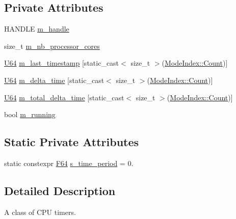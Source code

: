 \subsection*{Private Attributes}
\begin{DoxyCompactItemize}
\item 
H\+A\+N\+D\+LE \hyperlink{classmage_1_1_c_p_u_timer_a95b8ac18c050ed25293c8a923087369a}{m\+\_\+handle}
\item 
size\+\_\+t \hyperlink{classmage_1_1_c_p_u_timer_ac5fdb38a70c74815231b5efd8d746be1}{m\+\_\+nb\+\_\+processor\+\_\+cores}
\item 
\hyperlink{namespacemage_a6672cf3c861707ce4a3235a3eb43941d}{U64} \hyperlink{classmage_1_1_c_p_u_timer_a14b5ef7beba6c33769ac66ef171d0f0b}{m\+\_\+last\+\_\+timestamp} \mbox{[}static\+\_\+cast$<$ size\+\_\+t $>$(\hyperlink{classmage_1_1_c_p_u_timer_a98d59db3c396b14269c937e016c7625eae93f994f01c537c4e2f7d8528c3eb5e9}{Mode\+Index\+::\+Count})\mbox{]}
\item 
\hyperlink{namespacemage_a6672cf3c861707ce4a3235a3eb43941d}{U64} \hyperlink{classmage_1_1_c_p_u_timer_a2ce9eda81a57934b172b426238d4587d}{m\+\_\+delta\+\_\+time} \mbox{[}static\+\_\+cast$<$ size\+\_\+t $>$(\hyperlink{classmage_1_1_c_p_u_timer_a98d59db3c396b14269c937e016c7625eae93f994f01c537c4e2f7d8528c3eb5e9}{Mode\+Index\+::\+Count})\mbox{]}
\item 
\hyperlink{namespacemage_a6672cf3c861707ce4a3235a3eb43941d}{U64} \hyperlink{classmage_1_1_c_p_u_timer_a1c6d043eb08b1689d0f52dbd886fa9d4}{m\+\_\+total\+\_\+delta\+\_\+time} \mbox{[}static\+\_\+cast$<$ size\+\_\+t $>$(\hyperlink{classmage_1_1_c_p_u_timer_a98d59db3c396b14269c937e016c7625eae93f994f01c537c4e2f7d8528c3eb5e9}{Mode\+Index\+::\+Count})\mbox{]}
\item 
bool \hyperlink{classmage_1_1_c_p_u_timer_a7190afa453085b7bbd7cb76ff6bb62f2}{m\+\_\+running}
\end{DoxyCompactItemize}
\subsection*{Static Private Attributes}
\begin{DoxyCompactItemize}
\item 
static constexpr \hyperlink{namespacemage_ad26233bbec640deda836e572c1a23708}{F64} \hyperlink{classmage_1_1_c_p_u_timer_af7371eff8de8b5f667769ec71a69e9cf}{s\+\_\+time\+\_\+period} = 0.
\end{DoxyCompactItemize}


\subsection{Detailed Description}
A class of C\+PU timers. 

